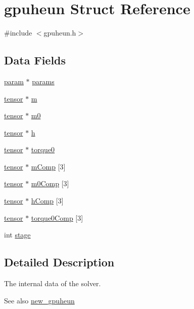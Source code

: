 \hypertarget{structgpuheun}{
\section{gpuheun Struct Reference}
\label{structgpuheun}
}


{\ttfamily \#include $<$gpuheun.h$>$}

\subsection*{Data Fields}
\begin{DoxyCompactItemize}
\item 
\hyperlink{structparam}{param} $\ast$ \hyperlink{structgpuheun_a83f1420f61c8d996ca9b5b628eb1f529}{params}
\item 
\hyperlink{structtensor}{tensor} $\ast$ \hyperlink{structgpuheun_ad6a8fd6913184306f6ba1a1a04c25f6d}{m}
\item 
\hyperlink{structtensor}{tensor} $\ast$ \hyperlink{structgpuheun_a29f07e020e3726b0e0a969c0054bb72d}{m0}
\item 
\hyperlink{structtensor}{tensor} $\ast$ \hyperlink{structgpuheun_a46f8656e846de7e3db0842175856eb78}{h}
\item 
\hyperlink{structtensor}{tensor} $\ast$ \hyperlink{structgpuheun_a246cba047c614e3d478f9bb901b26138}{torque0}
\item 
\hyperlink{structtensor}{tensor} $\ast$ \hyperlink{structgpuheun_aeee03bc1018dae008c269f1ada8185e6}{mComp} \mbox{[}3\mbox{]}
\item 
\hyperlink{structtensor}{tensor} $\ast$ \hyperlink{structgpuheun_a38d1d5b9d0f834be7803288efc029960}{m0Comp} \mbox{[}3\mbox{]}
\item 
\hyperlink{structtensor}{tensor} $\ast$ \hyperlink{structgpuheun_ad4952751eccd1d1e38a37f44f4abf933}{hComp} \mbox{[}3\mbox{]}
\item 
\hyperlink{structtensor}{tensor} $\ast$ \hyperlink{structgpuheun_a2da07934eedc37af28503ccbf3401d3b}{torque0Comp} \mbox{[}3\mbox{]}
\item 
int \hyperlink{structgpuheun_a88a5d914ef7c1d8861517729d37c942a}{stage}
\end{DoxyCompactItemize}


\subsection{Detailed Description}
The internal data of the solver. \begin{DoxySeeAlso}{See also}
\hyperlink{gpuheun_8h_a4508d3710582aba28a5f7c135b69560a}{new\_\-gpuheun} 
\end{DoxySeeAlso}


